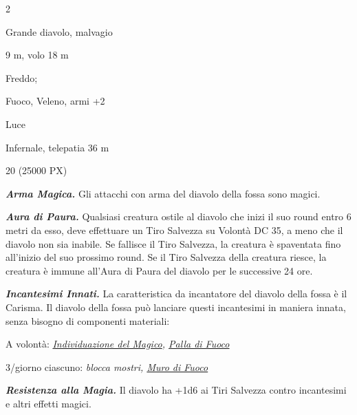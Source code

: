 \begin{multicols}{2}
{
\begin{description}[noitemsep, topsep=0pt, parsep=0pt, partopsep=0pt, itemsep=1pt, leftmargin=2.35cm,  labelwidth=2.2cm, itemindent=0cm, listparindent=0pt] %
\setlength{\baselineskip}{10pt}
\item[\textbf{Taglia/Tipo}] Grande diavolo, malvagio
\item[\textbf{Caratt.}] 
\item[\textbf{Punti Ferita}] 
\item[\textbf{Movimento}] 9 m, volo 18 m
\item[\textbf{Tiri Salvez.}] 
\item[\textbf{Res. Danni}] Freddo;
\item[\textbf{Imm. Danni}] Fuoco, Veleno, armi +2
\item[\textbf{Vulnerabilità}] Luce
\item[\textbf{Sensi}] 
\item[\textbf{Linguaggi}] Infernale, telepatia 36 m
\item[\textbf{Sfida}] 20 (25000 PX)
\end{description}
\smallskip

\emph{\textbf{Arma Magica.}} Gli attacchi con arma del diavolo della fossa sono magici.

\emph{\textbf{Aura di Paura.}} Qualsiasi creatura ostile al diavolo che inizi il suo round entro 6 metri da esso, deve effettuare un Tiro Salvezza su Volontà DC 35, a meno che il diavolo non sia inabile. Se fallisce il Tiro Salvezza, la creatura è spaventata fino all'inizio del suo prossimo round. Se il Tiro Salvezza della creatura riesce, la creatura è immune all'Aura di Paura del diavolo per le successive 24 ore.

\emph{\textbf{Incantesimi Innati.}} La caratteristica da incantatore del diavolo della fossa è il Carisma. Il diavolo della fossa può lanciare questi incantesimi in maniera innata, senza bisogno di componenti materiali:

A volontà: \emph{\hyperlink{Individuazione del Magico}{Individuazione del Magico}, \hyperlink{Palla di Fuoco}{Palla di Fuoco}}

3/giorno ciascuno: \emph{blocca mostri, \hyperlink{Muro di Fuoco}{Muro di Fuoco}}

\emph{\textbf{Resistenza alla Magia.}} Il diavolo ha +1d6 ai Tiri Salvezza contro incantesimi e altri effetti magici.

}
\end{multicols}

